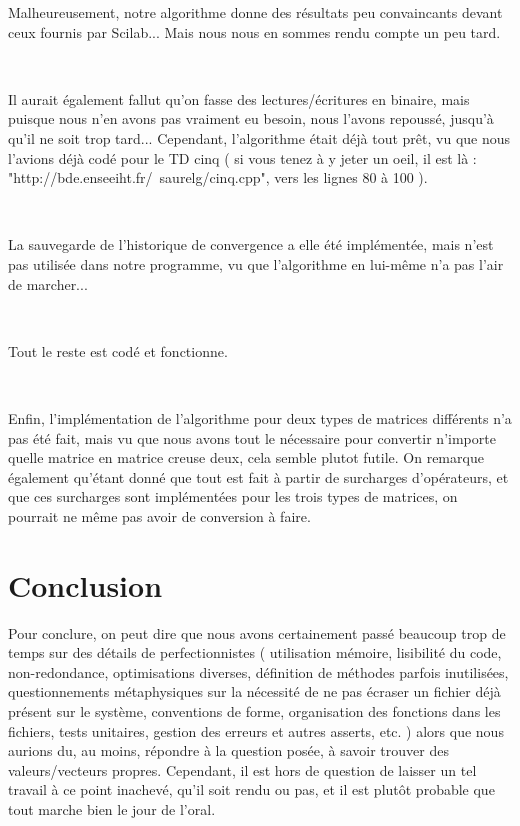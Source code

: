 \documentclass[a4paper]{article}
\begin{document}
Malheureusement, notre algorithme donne des résultats peu convaincants devant ceux fournis par Scilab... Mais nous nous en sommes rendu compte un peu tard.

~

Il aurait également fallut qu'on fasse des lectures/écritures en binaire, mais puisque nous n'en avons pas vraiment eu besoin, nous l'avons repoussé, jusqu'à qu'il ne soit trop tard... Cependant, l'algorithme était déjà tout prêt, vu que nous l'avions déjà codé pour le TD cinq ( si vous tenez à y jeter un oeil, il est là : "http://bde.enseeiht.fr/~saurelg/cinq.cpp", vers les lignes 80 à 100 ).

~

La sauvegarde de l'historique de convergence a elle été implémentée, mais n'est pas utilisée dans notre programme, vu que l'algorithme en lui-même n'a pas l'air de marcher...

~

Tout le reste est codé et fonctionne.

~

Enfin, l'implémentation de l'algorithme pour deux types de matrices différents n'a pas été fait, mais vu que nous avons tout le nécessaire pour convertir n'importe quelle matrice en matrice creuse deux, cela semble plutot futile. On remarque également qu'étant donné que tout est fait à partir de surcharges d'opérateurs, et que ces surcharges sont implémentées pour les trois types de matrices, on pourrait ne même pas avoir de conversion à faire.

\section{Conclusion}

Pour conclure, on peut dire que nous avons certainement passé beaucoup trop de temps sur des détails de perfectionnistes ( utilisation mémoire, lisibilité du code, non-redondance, optimisations diverses, définition de méthodes parfois inutilisées, questionnements métaphysiques sur la nécessité de ne pas écraser un fichier déjà présent sur le système, conventions de forme, organisation des fonctions dans les fichiers, tests unitaires, gestion des erreurs et autres asserts, etc. ) alors que nous aurions du, au moins, répondre à la question posée, à savoir trouver des valeurs/vecteurs propres. Cependant, il est hors de question de laisser un tel travail à ce point inachevé, qu'il soit rendu ou pas, et il est plutôt probable que tout marche bien le jour de l'oral.
\end{document}
